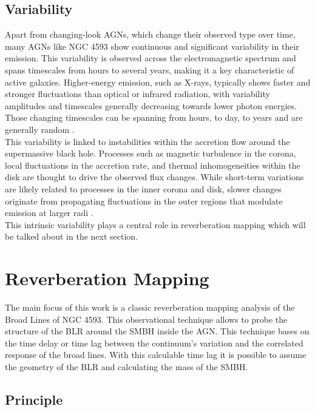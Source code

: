 \newpage

\subsection{Variability}
\label{sec:variability}
Apart from changing-look AGNs, which change their observed type over time, many AGNs like NGC 4593 show continuous and significant variability in their emission. This variability is observed across the electromagnetic spectrum and spans timescales from hours to several years, making it a key characteristic of active galaxies. Higher-energy emission, such as X-rays, typically shows faster and stronger fluctuations than optical or infrared radiation, with variability amplitudes and timescales generally decreasing towards lower photon energies. Those changing timescales can be spanning from hours, to day, to years and are generally random \parencite{Ulrich1997}.\\
This variability is linked to instabilities within the accretion flow around the supermassive black hole. Processes such as magnetic turbulence in the corona, local fluctuations in the accretion rate, and thermal inhomogeneities within the disk are thought to drive the observed flux changes. While short-term variations are likely related to processes in the inner corona and disk, slower changes originate from propagating fluctuations in the outer regions that modulate emission at larger radi \parencite{Hagen2024}.\\
This intrinsic variability plays a central role in reverberation mapping which will be talked about in the next section. 

\section{Reverberation Mapping}
\label{sec:reverberation_mapping}

The main focus of this work is a classic reverberation mapping analysis of the Broad Lines of NGC 4593. This observational technique allows to probe the structure of the BLR around the SMBH inside the AGN. This technique bases on the time delay or time lag between the continuum's variation and the correlated response of the broad lines. With this calculable time lag it is possible to assume the geometry of the BLR and calculating the mass of the SMBH.  


\subsection{Principle}
\label{subsec:rm_principle}


